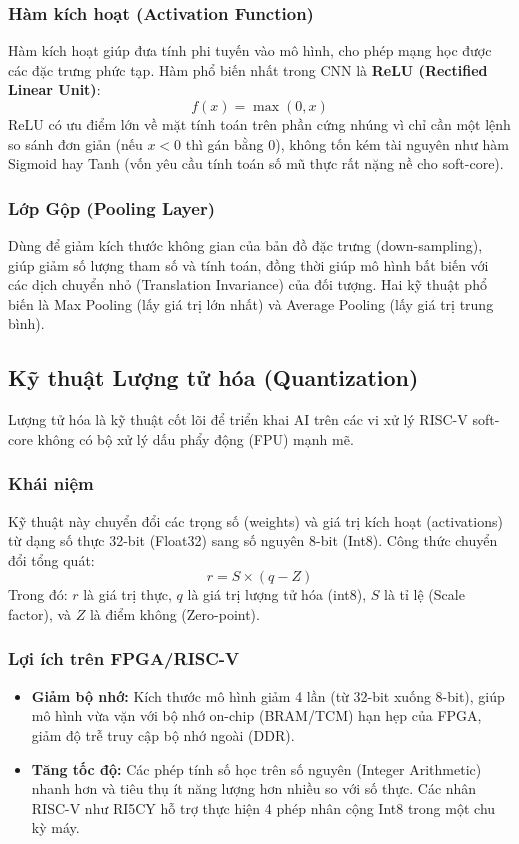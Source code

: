 \subsubsection{Hàm kích hoạt (Activation Function)}
Hàm kích hoạt giúp đưa tính phi tuyến vào mô hình, cho phép mạng học được các đặc trưng phức tạp. Hàm phổ biến nhất trong CNN là \textbf{ReLU (Rectified Linear Unit)}:
\begin{equation}
f(x) = \max(0, x)
\end{equation}
ReLU có ưu điểm lớn về mặt tính toán trên phần cứng nhúng vì chỉ cần một lệnh so sánh đơn giản (nếu $x < 0$ thì gán bằng 0), không tốn kém tài nguyên như hàm Sigmoid hay Tanh (vốn yêu cầu tính toán số mũ thực rất nặng nề cho soft-core).

\subsubsection{Lớp Gộp (Pooling Layer)}
Dùng để giảm kích thước không gian của bản đồ đặc trưng (down-sampling), giúp giảm số lượng tham số và tính toán, đồng thời giúp mô hình bất biến với các dịch chuyển nhỏ (Translation Invariance) của đối tượng. Hai kỹ thuật phổ biến là Max Pooling (lấy giá trị lớn nhất) và Average Pooling (lấy giá trị trung bình).

\subsection{Kỹ thuật Lượng tử hóa (Quantization)}
Lượng tử hóa là kỹ thuật cốt lõi để triển khai AI trên các vi xử lý RISC-V soft-core không có bộ xử lý dấu phẩy động (FPU) mạnh mẽ.

\subsubsection{Khái niệm}
Kỹ thuật này chuyển đổi các trọng số (weights) và giá trị kích hoạt (activations) từ dạng số thực 32-bit (Float32) sang số nguyên 8-bit (Int8). Công thức chuyển đổi tổng quát:
\begin{equation}
r = S \times (q - Z)
\end{equation}
Trong đó: $r$ là giá trị thực, $q$ là giá trị lượng tử hóa (int8), $S$ là tỉ lệ (Scale factor), và $Z$ là điểm không (Zero-point).

\subsubsection{Lợi ích trên FPGA/RISC-V}
\begin{itemize}
    \item \textbf{Giảm bộ nhớ:} Kích thước mô hình giảm 4 lần (từ 32-bit xuống 8-bit), giúp mô hình vừa vặn với bộ nhớ on-chip (BRAM/TCM) hạn hẹp của FPGA, giảm độ trễ truy cập bộ nhớ ngoài (DDR).
    \item \textbf{Tăng tốc độ:} Các phép tính số học trên số nguyên (Integer Arithmetic) nhanh hơn và tiêu thụ ít năng lượng hơn nhiều so với số thực. Các nhân RISC-V như RI5CY hỗ trợ thực hiện 4 phép nhân cộng Int8 trong một chu kỳ máy.
\end{itemize}

